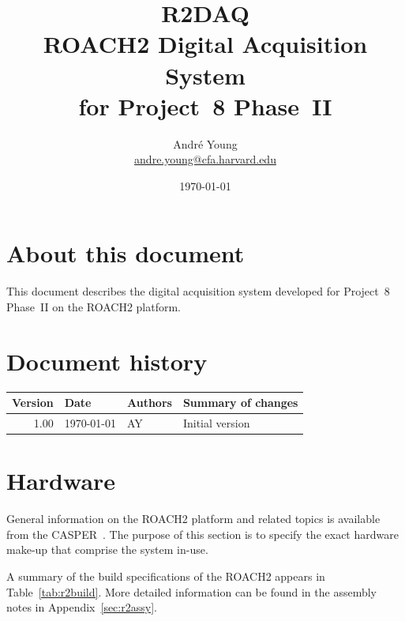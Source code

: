 \documentclass[a4paper,10pt]{article}
\title{R2DAQ\\{\Large ROACH2 Digital Acquisition System\\for Project~8 Phase~II}}
\author{Andr\'e Young\\\url{andre.young@cfa.harvard.edu}}
\date{\today}
\newcommand{\tabref}[1]{Table~\ref{#1}}
\begin{document}
\maketitle 

\section*{About this document}
This document describes the digital acquisition system developed for 
Project~8 Phase~II on the ROACH2 platform.

\section*{Document history}
\begin{tabularx}{1.0\textwidth}{|r|l|l|X|}
	\hline
	{\bf Version} & {\bf Date} & {\bf Authors} & {\bf Summary of changes}\\
	\hline
	1.00 & \today & AY & Initial version\\
	\hline
\end{tabularx}

\tableofcontents{}
\listoffigures{}
\listoftables

\section{Hardware}
\label{sec:hardware}
General information on the ROACH2 platform and related topics is 
available from the CASPER~\cite{casperroach2}. The purpose of this section is 
to specify the exact hardware make-up that comprise the system in-use.

A summary of the build specifications of the ROACH2 appears in 
\tabref{tab:r2build}. More detailed information can be found in the 
assembly notes in Appendix~\ref{sec:r2assy}.
\end{document}
